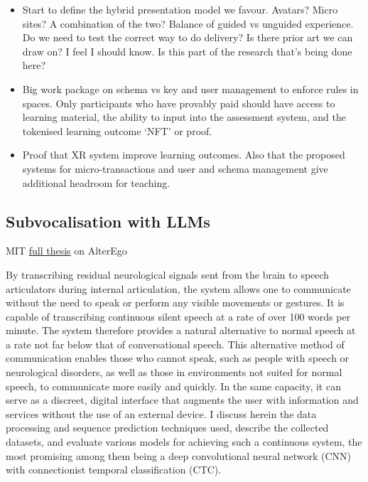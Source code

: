 \begin{itemize}
\item Start to define the hybrid presentation model we favour. Avatars? Micro sites? A combination of the two? Balance of guided vs unguided experience. Do we need to test the correct way to do delivery? Is there prior art we can draw on? I feel I should know. Is this part of the research that's being done here?
\item Big work package on schema vs key and user management to enforce rules in spaces. Only participants who have provably paid should have access to learning material, the ability to input into the assessment system, and the tokenised learning outcome `NFT' or proof.
\item Proof that XR system improve learning outcomes. Also that the proposed systems for micro-transactions and user and schema management give additional headroom for teaching.
\end{itemize}
\subsection{Subvocalisation with LLMs}
MIT \href{https://dspace.mit.edu/handle/1721.1/123121}{full thesis} on AlterEgo
\begin{tcolorbox}[enhanced, frame style={fill=lightgray}, interior style={fill=lightgray}]
By transcribing residual neurological signals sent from the brain to speech articulators during internal articulation, the system allows one to communicate without the need to speak or perform any visible movements or gestures. It is capable of transcribing continuous silent speech at a rate of over 100 words per minute. The system therefore provides a natural alternative to normal speech at a rate not far below that of conversational speech. This alternative method of communication enables those who cannot speak, such as people with speech or neurological disorders, as well as those in environments not suited for normal speech, to communicate more easily and quickly. In the same capacity, it can serve as a discreet, digital interface that augments the user with information and services without the use of an external device. I discuss herein the data processing and sequence prediction techniques used, describe the collected datasets, and evaluate various models for achieving such a continuous system, the most promising among them being a deep convolutional neural network (CNN) with connectionist temporal classification (CTC).
\end{tcolorbox}
